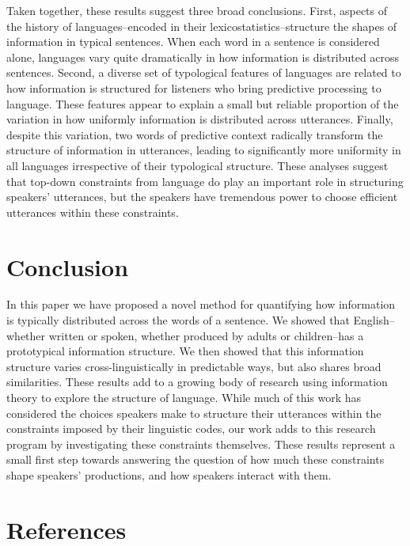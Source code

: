 \documentclass[10pt, letterpaper]{article}
\begin{document}
Taken together, these results suggest three broad conclusions. First,
aspects of the history of languages--encoded in their
lexicostatistics--structure the shapes of information in typical
sentences. When each word in a sentence is considered alone, languages
vary quite dramatically in how information is distributed across
sentences. Second, a diverse set of typological features of languages
are related to how information is structured for listeners who bring
predictive processing to language. These features appear to explain a
small but reliable proportion of the variation in how uniformly
information is distributed across utterances. Finally, despite this
variation, two words of predictive context radically transform the
structure of information in utterances, leading to significantly more
uniformity in all languages irrespective of their typological structure.
These analyses suggest that top-down constraints from language do play
an important role in structuring speakers' utterances, but the speakers
have tremendous power to choose efficient utterances within these
constraints.

\hypertarget{conclusion}{%
\section{Conclusion}\label{conclusion}}

In this paper we have proposed a novel method for quantifying how
information is typically distributed across the words of a sentence. We
showed that English--whether written or spoken, whether produced by
adults or children--has a prototypical information structure. We then
showed that this information structure varies cross-linguistically in
predictable ways, but also shares broad similarities. These results add
to a growing body of research using information theory to explore the
structure of language. While much of this work has considered the
choices speakers make to structure their utterances within the
constraints imposed by their linguistic codes, our work adds to this
research program by investigating these constraints themselves. These
results represent a small first step towards answering the question of
how much these constraints shape speakers' productions, and how speakers
interact with them.

\hypertarget{references}{%
\section{References}\label{references}}
\end{document}
